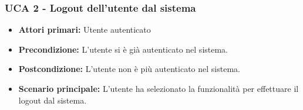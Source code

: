 \subsubsection{UCA 2 - Logout dell'utente dal sistema}%
\begin{itemize}
\item \textbf{Attori primari:} Utente autenticato
\item \textbf{Precondizione:} L'utente si è già autenticato nel sistema.
\item \textbf{Postcondizione:}  L'utente non è più autenticato nel sistema.
\item \textbf{Scenario principale:} L'utente ha selezionato la funzionalità per effettuare il logout dal sistema.
\end{itemize}